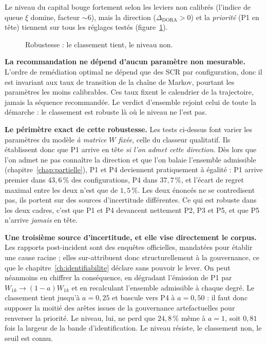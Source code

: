 Le niveau du capital bouge fortement selon les leviers non calibrés (l'indice de queue $\xi$
domine, facteur $\sim 6$), mais la direction ($\Delta_{\text{DORA}}>0$) et la
\emph{priorité} (P1 en tête) tiennent sur tous les réglages testés (figure~\ref{fig:robust}).

\begin{figure}[htbp]\centering
{}
\caption{Robustesse : le classement tient, le niveau non.}
\label{fig:robust}
\end{figure}

\begin{cle}
\textbf{La recommandation ne dépend d'aucun paramètre non mesurable.} L'ordre de remédiation
optimal ne dépend que des SCR par configuration, donc il est invariant aux taux de
transition de la chaîne de Markov, pourtant les paramètres les moins calibrables. Ces taux
fixent le calendrier de la trajectoire, jamais la séquence recommandée. Le verdict d'ensemble
rejoint celui de toute la démarche : le classement est robuste là où le niveau ne l'est pas.
\end{cle}

\begin{attention}
\textbf{Le périmètre exact de cette robustesse.} Les tests ci-dessus font
varier les paramètres du modèle \emph{à matrice $W$ fixée}, celle du classeur qualitatif. Ils
établissent donc que P1 arrive en tête \emph{si l'on admet cette direction}. Dès lors que l'on
admet ne pas connaître la direction et que l'on balaie l'ensemble admissible
(chapitre~\ref{chap:partielle}), P1 et P4 deviennent pratiquement à égalité : P1 arrive
premier dans $43{,}6\,\%$ des configurations, P4 dans $37{,}7\,\%$, et l'écart de regret maximal entre
les deux n'est que de $1{,}5\,\%$. Les deux énoncés ne se contredisent pas, ils portent sur des
sources d'incertitude différentes. Ce qui est robuste dans les deux cadres, c'est que P1 et P4
devancent nettement P2, P3 et P5, et que P5 n'arrive \emph{jamais} en tête.

\medskip
\noindent\textbf{Une troisième source d'incertitude, et elle vise directement le corpus.} Les
rapports post-incident sont des enquêtes officielles, mandatées pour établir une cause racine ;
elles sur-attribuent donc structurellement à la gouvernance, ce que le
chapitre~\ref{ch:identifiabilite} déclare sans pouvoir le lever. On peut néanmoins en chiffrer la
conséquence, en dégradant l'émission de P1 par $W_{1k}\to(1-a)W_{1k}$ et en recalculant l'ensemble
admissible à chaque degré. Le classement tient jusqu'à $a=0{,}25$ et bascule vers P4 à
$a=0{,}50$ : il faut donc supposer la moitié des arêtes issues de la gouvernance
artefactuelles pour renverser la priorité. Le niveau, lui, ne perd que $24{,}8\,\%$ même à
$a=1$, soit $0{,}81$ fois la largeur de la bande d'identification. Le niveau résiste, le
classement non, le seuil est connu.
\end{attention}

